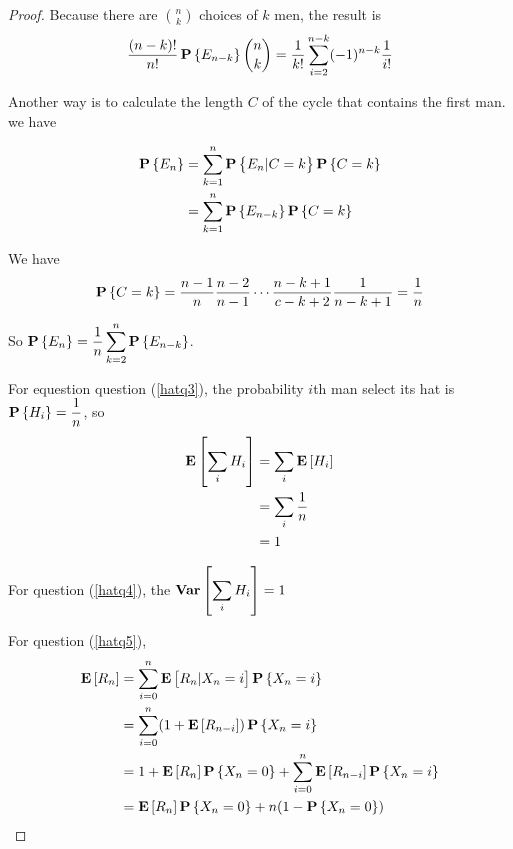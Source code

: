 \begin{proof}
    Because there are $\binom{n}{k}$ choices of $k$ men, the result is
    \begin{equation*}
        \frac{(n-k)!}{n!} \mathop{\bf P\/}\displaystyle \left\{E_{n-k}\right\} \binom{n}{k} = \frac{1}{k!} \sum_{i=2}^{n-k} (-1)^{n-k} \frac{1}{i!}
    \end{equation*}
    
    Another way is to calculate the length $C$ of the cycle that contains the first man. we have 
    
    \begin{equation*}
    \begin{aligned}
        \mathop{\bf P\/}\displaystyle \left\{E_n\right\} &= \sum_{k=1}^n \mathop{\bf P\/}\displaystyle \left\{E_n|C=k\right\} \mathop{\bf P\/}\displaystyle \left\{C=k\right\} \\
        &= \sum_{k=1}^n \mathop{\bf P\/}\displaystyle \left\{E_{n-k}\right\} \mathop{\bf P\/}\displaystyle \left\{C=k\right\}
    \end{aligned}
    \end{equation*}
    
    We have 
    \begin{equation*}
        \mathop{\bf P\/}\displaystyle \left\{C=k\right\} = \frac{n-1}{n} \frac{n-2}{n-1} \cdots \frac{n-k+1}{c-k+2} \frac{1}{n-k+1} = \frac{1}{n}
    \end{equation*}
    
    So $\displaystyle \mathop{\bf P\/}\displaystyle \left\{E_n\right\} = \frac{1}{n} \sum_{k=2}^n \mathop{\bf P\/}\displaystyle \left\{E_{n-k}\right\}$.
    
    
    
    For equestion question (\ref{hatq3}), the probability $i$th man select its hat is $\displaystyle \mathop{\bf P\/}\displaystyle \left\{H_i\right\} = \frac{1}{n}$, so 
    \begin{equation*}
        \begin{aligned}
            \mathop{\bf E\/}\displaystyle \left[ \sum_i H_i \right] &= \sum_i \mathop{\bf E\/}\displaystyle \left[ H_i \right] \\
            &= \sum_i \frac{1}{n} \\
            &= 1
        \end{aligned}
    \end{equation*}
    
    For question (\ref{hatq4}), the $\mathop{\bf Var\/}\displaystyle \left[  \sum_i H_i \right] = 1$
    
    For question (\ref{hatq5}), 
    \begin{equation*}
    \begin{aligned}
        \mathop{\bf E\/}\displaystyle \left[ R_n \right] &= \sum_{i=0}^n \mathop{\bf E\/}\displaystyle \left[ R_n | X_n = i \right] \mathop{\bf P\/}\displaystyle \left\{X_n = i\right\} \\
        &= \sum_{i=0}^n (1 + \mathop{\bf E\/}\displaystyle \left[ R_{n - i} \right]) \mathop{\bf P\/}\displaystyle \left\{X_n = i\right\} \\
        &= 1 + \mathop{\bf E\/}\displaystyle \left[ R_n \right] \mathop{\bf P\/}\displaystyle \left\{X_n = 0\right\} + \sum_{i=0}^n \mathop{\bf E\/}\displaystyle \left[ R_{n-i} \right] \mathop{\bf P\/}\displaystyle \left\{X_n=i\right\} \\
        &= \mathop{\bf E\/}\displaystyle \left[ R_n \right] \mathop{\bf P\/}\displaystyle \left\{X_n = 0\right\} + n(1 - \mathop{\bf P\/}\displaystyle \left\{X_n = 0\right\} )
    \end{aligned}
    \end{equation*}
    

\end{proof}
